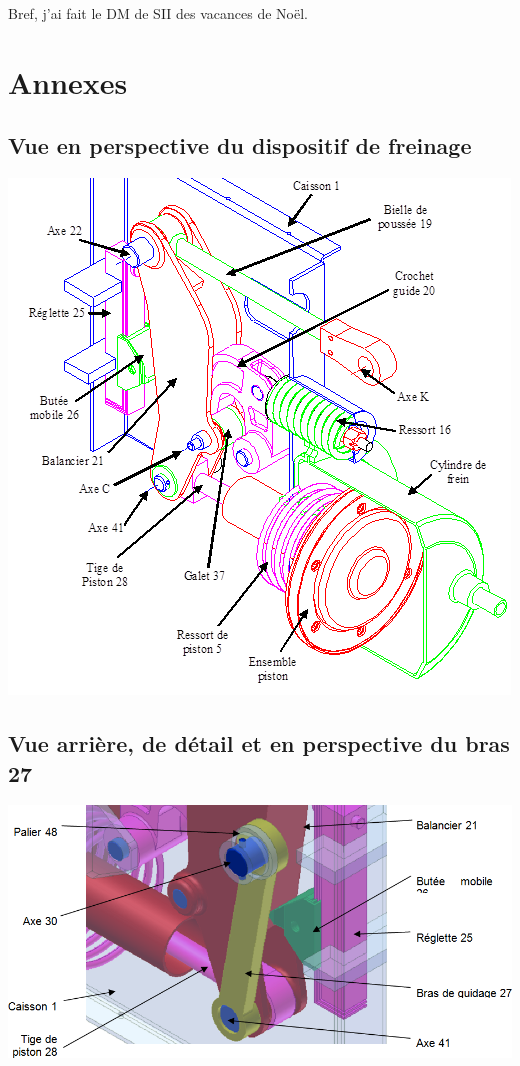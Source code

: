 \documentclass[11pt,oneside]{article}
\begin{document}
Bref, j'ai fait le DM de SII des vacances de Noël. 

\section{Annexes}
\subsection{Vue en perspective du dispositif de freinage}
\begin{center}
\includegraphics[width=.8\textwidth]{png/img7}
\end{center}

\subsection{Vue arrière, de détail et en perspective du bras 27}
\begin{center}
\includegraphics[width=.8\textwidth]{png/img8}
\end{center}
\end{document}
